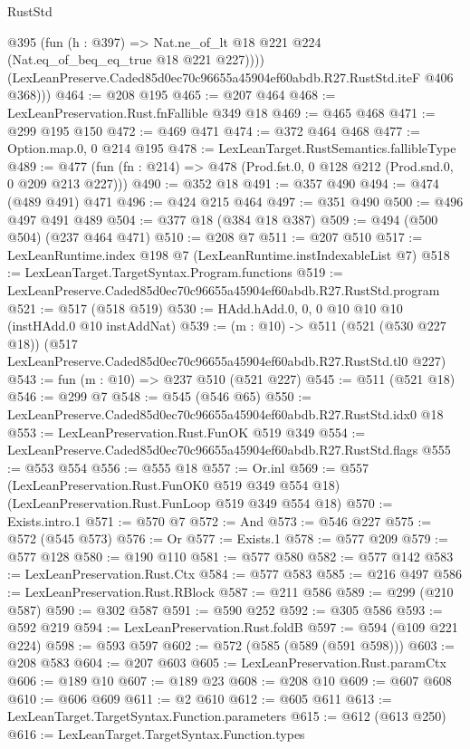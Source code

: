 \begin{lexlean}{RustStd}
\begin{coremodule}
            @395
            (fun (h : @397) => Nat.ne_of_lt @18 @221 @224 (Nat.eq_of_beq_eq_true @18 @221 @227))))
        (LexLeanPreserve.Caded85d0ec70c96655a45904ef60abdb.R27.RustStd.iteF @406 @368)))
@464 := @208 @195
@465 := @207 @464
@468 := LexLeanPreservation.Rust.fnFallible @349 @18
@469 := @465 @468
@471 := @299 @195 @150
@472 := @469 @471
@474 := @372 @464 @468
@477 := Option.map.{0, 0} @214 @195
@478 := LexLeanTarget.RustSemantics.fallibleType
@489 := @477 (fun (fn : @214) => @478 (Prod.fst.{0, 0} @128 @212 (Prod.snd.{0, 0} @209 @213 @227)))
@490 := @352 @18
@491 := @357 @490
@494 := @474 (@489 @491) @471
@496 := @424 @215 @464
@497 := @351 @490
@500 := @496 @497 @491 @489
@504 := @377 @18 (@384 @18 @387)
@509 := @494 (@500 @504) (@237 @464 @471)
@510 := @208 @7
@511 := @207 @510
@517 := LexLeanRuntime.index @198 @7 (LexLeanRuntime.instIndexableList @7)
@518 := LexLeanTarget.TargetSyntax.Program.functions
@519 := LexLeanPreserve.Caded85d0ec70c96655a45904ef60abdb.R27.RustStd.program
@521 := @517 (@518 @519)
@530 := HAdd.hAdd.{0, 0, 0} @10 @10 @10 (instHAdd.{0} @10 instAddNat)
@539 := (m : @10) ->
  @511
    (@521 (@530 @227 @18))
    (@517 LexLeanPreserve.Caded85d0ec70c96655a45904ef60abdb.R27.RustStd.tl0 @227)
@543 := fun (m : @10) => @237 @510 (@521 @227)
@545 := @511 (@521 @18)
@546 := @299 @7
@548 := @545 (@546 @65)
@550 := LexLeanPreserve.Caded85d0ec70c96655a45904ef60abdb.R27.RustStd.idx0 @18
@553 := LexLeanPreservation.Rust.FunOK @519 @349
@554 := LexLeanPreserve.Caded85d0ec70c96655a45904ef60abdb.R27.RustStd.flags
@555 := @553 @554
@556 := @555 @18
@557 := Or.inl
@569 := @557
    (LexLeanPreservation.Rust.FunOK0 @519 @349 @554 @18)
    (LexLeanPreservation.Rust.FunLoop @519 @349 @554 @18)
@570 := Exists.intro.{1}
@571 := @570 @7
@572 := And
@573 := @546 @227
@575 := @572 (@545 @573)
@576 := Or
@577 := Exists.{1}
@578 := @577 @209
@579 := @577 @128
@580 := @190 @110
@581 := @577 @580
@582 := @577 @142
@583 := LexLeanPreservation.Rust.Ctx
@584 := @577 @583
@585 := @216 @497
@586 := LexLeanPreservation.Rust.RBlock
@587 := @211 @586
@589 := @299 (@210 @587)
@590 := @302 @587
@591 := @590 @252
@592 := @305 @586
@593 := @592 @219
@594 := LexLeanPreservation.Rust.foldB
@597 := @594 (@109 @221 @224)
@598 := @593 @597
@602 := @572 (@585 (@589 (@591 @598)))
@603 := @208 @583
@604 := @207 @603
@605 := LexLeanPreservation.Rust.paramCtx
@606 := @189 @10
@607 := @189 @23
@608 := @208 @10
@609 := @607 @608
@610 := @606 @609
@611 := @2 @610
@612 := @605 @611
@613 := LexLeanTarget.TargetSyntax.Function.parameters
@615 := @612 (@613 @250)
@616 := LexLeanTarget.TargetSyntax.Function.types

\end{coremodule}
\end{lexlean}
